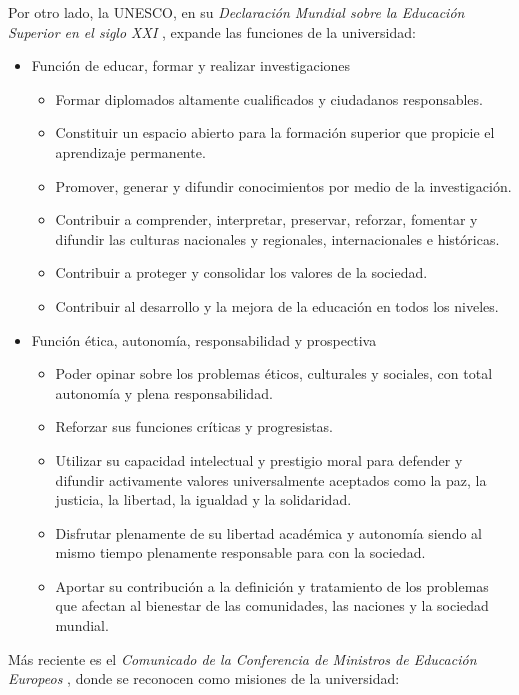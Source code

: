 \documentclass[a4paper,12pt,twoside]{article}
\begin{document}
Por otro lado, la UNESCO, en su \textit{Declaración Mundial sobre la Educación Superior en el siglo XXI} \cite{unesco}, expande las funciones de la universidad:

\begin{itemize}
\item Función de educar, formar y realizar investigaciones
\begin{itemize}
\item Formar diplomados altamente cualificados y ciudadanos responsables.
\item Constituir un espacio abierto para la formación superior que propicie el
aprendizaje permanente.
\item Promover, generar y difundir conocimientos por medio de la investigación.
\item Contribuir a comprender, interpretar, preservar, reforzar, fomentar y difundir
las culturas nacionales y regionales, internacionales e históricas.
\item Contribuir a proteger y consolidar los valores de la sociedad.
\item Contribuir al desarrollo y la mejora de la educación en todos los niveles.
\end{itemize}
\item Función ética, autonomía, responsabilidad y prospectiva
\begin{itemize}
\item Poder opinar sobre los problemas éticos, culturales y sociales, con total
autonomía y plena responsabilidad.
\item Reforzar sus funciones críticas y progresistas.
\item Utilizar su capacidad intelectual y prestigio moral para defender y difundir
activamente valores universalmente aceptados como la paz, la justicia, la libertad, la igualdad y la solidaridad.
\item Disfrutar plenamente de su libertad académica y autonomía siendo al mismo tiempo
plenamente responsable para con la sociedad.
\item Aportar su contribución a la definición y tratamiento de los problemas que
afectan al bienestar de las comunidades, las naciones y la sociedad mundial.
\end{itemize}
\end{itemize}

Más reciente es el \textit{Comunicado de la Conferencia de Ministros de Educación Europeos} \cite{Com2009}, donde se reconocen como misiones de la universidad:
\end{document}
